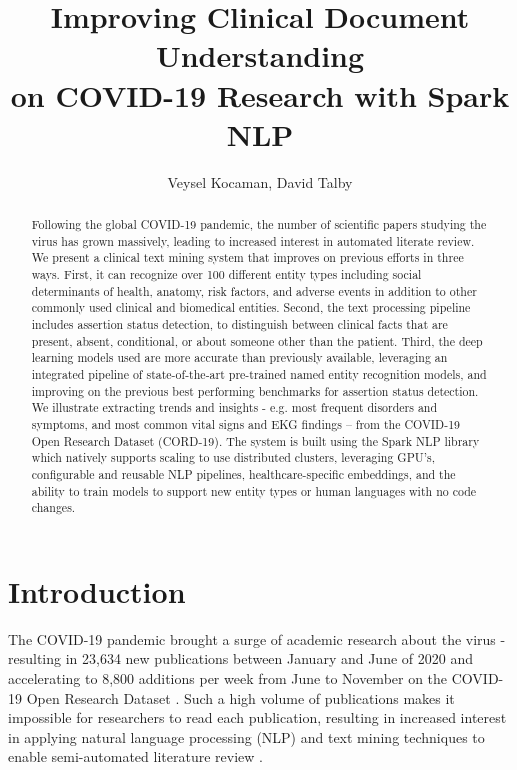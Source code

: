 \documentclass[letterpaper]{article} \usepackage{aaai21}  \usepackage{times}  \usepackage{helvet} \usepackage{courier}  \usepackage[hyphens]{url}  \usepackage{graphicx} \urlstyle{rm} \def\UrlFont{\rm}  \usepackage{natbib}  \usepackage{caption} \frenchspacing  \setlength{\pdfpagewidth}{8.5in}  \setlength{\pdfpageheight}{11in}  \usepackage{lscape}
\title{Improving Clinical Document Understanding\\ on COVID-19 Research with Spark NLP}
\author{
Veysel Kocaman,
    David Talby
    \\
}
\begin{document}
\maketitle

\begin{abstract}
Following the global COVID-19 pandemic, the number of scientific papers studying the virus has grown massively, leading to increased interest in automated literate review. We present a clinical text mining system that improves on previous efforts in three ways. First, it can recognize over 100 different entity types including social determinants of health, anatomy, risk factors, and adverse events in addition to other commonly used clinical and biomedical entities. Second, the text processing pipeline includes assertion status detection, to distinguish between clinical facts that are present, absent, conditional, or about someone other than the patient. Third, the deep learning models used are more accurate than previously available, leveraging an integrated pipeline of state-of-the-art pre-trained named entity recognition models, and improving on the previous best performing benchmarks for assertion status detection. We illustrate extracting trends and insights - e.g. most frequent disorders and symptoms, and most common vital signs and EKG findings – from the COVID-19 Open Research Dataset (CORD-19). The system is built using the Spark NLP library which natively supports scaling to use distributed clusters, leveraging GPU’s, configurable and reusable NLP pipelines, healthcare-specific embeddings, and the ability to train models to support new entity types or human languages with no code changes.

\end{abstract}

\section{Introduction}
\label{sec:introduction}

The COVID-19 pandemic brought a surge of academic research about the virus - resulting in 23,634 new publications between January and June of 2020 \cite{Silva2020PublishingVI} and accelerating to 8,800 additions per week from June to November on the COVID-19 Open Research Dataset \cite{wang2020cord}. Such a high volume of publications makes it impossible for researchers to read each publication, resulting in increased interest in applying natural language processing (NLP) and text mining techniques to enable semi-automated literature review \cite{Cheng2020AnOO}.
\end{document}
